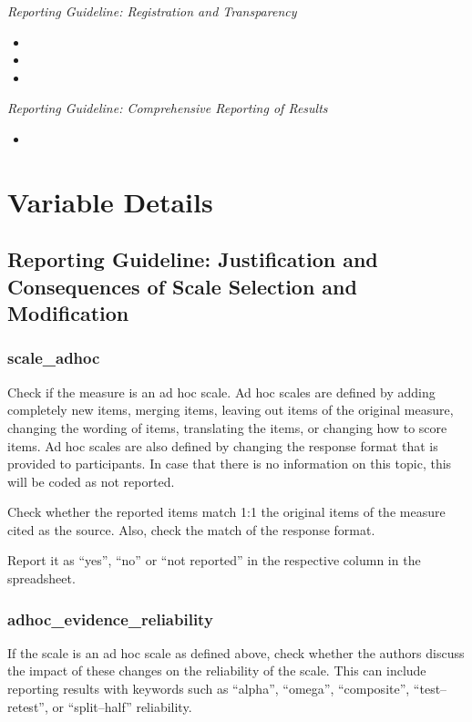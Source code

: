 {\textit{Reporting Guideline: Registration and Transparency}
\begin{itemize}
\item {}  %
\item {} 
\item {} 
\end{itemize}

\textit{Reporting Guideline: Comprehensive Reporting of Results}
\begin{itemize}
\item {}  %
\end{itemize}


\section{Variable Details}


\subsection*{Reporting Guideline: Justification and Consequences of Scale Selection and Modification}

\subsubsection*{scale\_adhoc}
\label{adhoc}
Check if the measure is an ad hoc scale. Ad hoc scales are defined by adding completely new items, merging items, leaving out items of the original measure, changing the wording of items, translating the items, or changing how to score items. Ad hoc scales are also defined by changing the response format that is provided to participants. In case that there is no information on this topic, this will be coded as not reported.

Check whether the reported items match 1:1 the original items of the measure cited as the source. Also, check the match of the response format.

Report it as ``yes'', ``no'' or ``not reported'' in the respective column in the spreadsheet.

\subsubsection*{adhoc\_evidence\_reliability}
\label{adhocreliable}
If the scale is an ad hoc scale as defined above, check whether the authors discuss the impact of these changes on the reliability of the scale. This can include reporting results with keywords such as ``alpha'', ``omega'', ``composite'', ``test--retest'', or ``split--half'' reliability.

}
